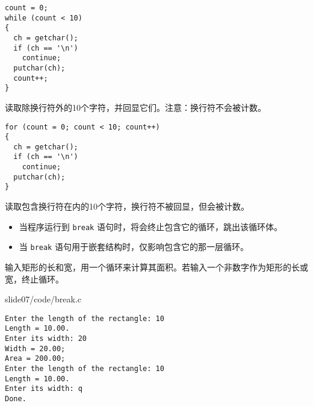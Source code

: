 \begin{frame}[fragile]
\begin{lstlisting}
count = 0;
while (count < 10)
{
  ch = getchar();
  if (ch == '\n')
    continue;
  putchar(ch);
  count++;
}
\end{lstlisting}
读取除换行符外的10个字符，并回显它们。注意：换行符不会被计数。
\end{frame}

\begin{frame}[fragile]
\begin{lstlisting}
for (count = 0; count < 10; count++)
{
  ch = getchar();
  if (ch == '\n')
    continue;
  putchar(ch);
}
\end{lstlisting}
读取包含换行符在内的10个字符，换行符不被回显，但会被计数。
\end{frame}

\begin{frame}[fragile]
\begin{itemize}
\item
当程序运行到 \lstinline|break| 语句时，将会终止包含它的循环，跳出该循环体。\\[0.1in]
\item
当 \lstinline|break| 语句用于嵌套结构时，仅影响包含它的那一层循环。
\end{itemize}
\end{frame}

\begin{frame}[fragile]
\begin{free}[例]{}
输入矩形的长和宽，用一个循环来计算其面积。若输入一个非数字作为矩形的长或宽，终止循环。
\end{free}
\end{frame}

\begin{frame}


            {slide07/code/break.c}
\end{frame}


\begin{frame}[fragile]
\begin{lstlisting}[backgroundcolor=\color{red!10}]
Enter the length of the rectangle: 10
Length = 10.00.
Enter its width: 20
Width = 20.00;
Area = 200.00; 
Enter the length of the rectangle: 10
Length = 10.00.
Enter its width: q
Done.
\end{lstlisting}
\end{frame}

